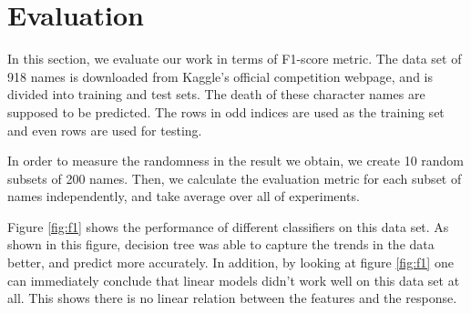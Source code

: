 \documentclass[letterpaper]{article}
\begin{document}











\section{Evaluation}

In this section, we evaluate our work in terms of F1-score metric. The data set of 918 names is downloaded from Kaggle's official competition webpage, and is divided into training and test sets. The death of these character names are supposed to be predicted. The rows in odd indices are used as the training set and even rows are used for testing. 

In order to measure the randomness in the result we obtain, we create 10 random subsets of 200 names. Then, we calculate the evaluation metric for each subset of names independently, and take average over all of experiments.


Figure \ref{fig:f1} shows the performance of different classifiers on this data set. As shown in this figure, decision tree was able to capture the trends in the data better, and predict more accurately. In addition, by looking at figure \ref{fig:f1} one can immediately conclude that linear models didn't work well on this data set at all. This shows there is no linear relation between the features and the response.
\end{document}
